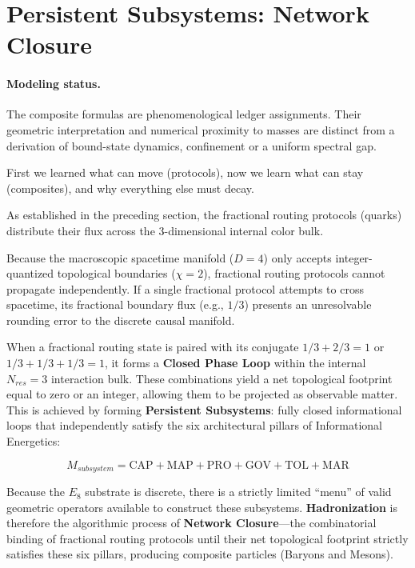 \section{Persistent Subsystems: Network Closure}

\paragraph{Modeling status.} The composite formulas are phenomenological ledger assignments. Their geometric interpretation and numerical proximity to masses are distinct from a derivation of bound-state dynamics, confinement or a uniform spectral gap.

First we learned what can move (protocols), now we learn what can stay (composites), and why everything else must decay.

As established in the preceding section, the fractional routing protocols (quarks) distribute their flux across the 3-dimensional internal color bulk. 

Because the macroscopic spacetime manifold ($D=4$) only accepts integer-quantized topological boundaries ($\chi=2$), fractional routing protocols cannot propagate independently. If a single fractional protocol attempts to cross spacetime, its fractional boundary flux (e.g., $1/3$) presents an unresolvable rounding error to the discrete causal manifold.

When a fractional routing state is paired with its conjugate $1/3 + 2/3 = 1$ or $1/3 + 1/3 + 1/3 = 1$, it forms a \textbf{Closed Phase Loop} within the internal $N_{res} = 3$ interaction bulk. These combinations yield a net topological footprint equal to zero or an integer, allowing them to be projected as observable matter. This is achieved by forming \textbf{Persistent Subsystems}: fully closed informational loops that independently satisfy the six architectural pillars of Informational Energetics:

\begin{equation}
    M_{subsystem} = \text{CAP} + \text{MAP} + \text{PRO} + \text{GOV} + \text{TOL} + \text{MAR}
\end{equation}

Because the $E_8$ substrate is discrete, there is a strictly limited ``menu'' of valid geometric operators available to construct these subsystems. \textbf{Hadronization} is therefore the algorithmic process of \textbf{Network Closure}---the combinatorial binding of fractional routing protocols until their net topological footprint strictly satisfies these six pillars, producing composite particles (Baryons and Mesons). 

